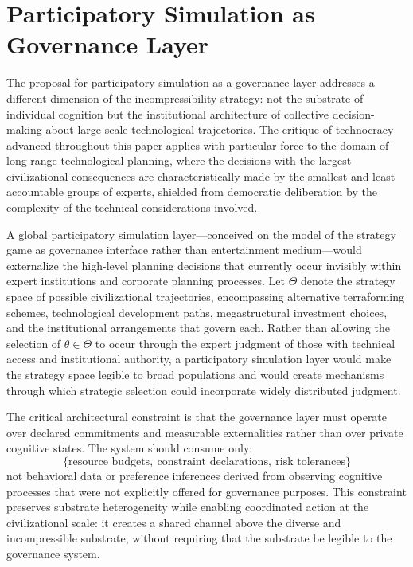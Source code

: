 \documentclass[12pt]{article}
\begin{document}
\section{Participatory Simulation as Governance Layer}

The proposal for participatory simulation as a governance layer addresses a different dimension of the incompressibility strategy: not the substrate of individual cognition but the institutional architecture of collective decision-making about large-scale technological trajectories. The critique of technocracy advanced throughout this paper applies with particular force to the domain of long-range technological planning, where the decisions with the largest civilizational consequences are characteristically made by the smallest and least accountable groups of experts, shielded from democratic deliberation by the complexity of the technical considerations involved.

A global participatory simulation layer---conceived on the model of the strategy game as governance interface rather than entertainment medium---would externalize the high-level planning decisions that currently occur invisibly within expert institutions and corporate planning processes. Let $\Theta$ denote the strategy space of possible civilizational trajectories, encompassing alternative terraforming schemes, technological development paths, megastructural investment choices, and the institutional arrangements that govern each. Rather than allowing the selection of $\theta \in \Theta$ to occur through the expert judgment of those with technical access and institutional authority, a participatory simulation layer would make the strategy space legible to broad populations and would create mechanisms through which strategic selection could incorporate widely distributed judgment.

The critical architectural constraint is that the governance layer must operate over declared commitments and measurable externalities rather than over private cognitive states. The system should consume only:
\[
\{ \text{resource budgets},\ \text{constraint declarations},\ \text{risk tolerances} \}
\]
not behavioral data or preference inferences derived from observing cognitive processes that were not explicitly offered for governance purposes. This constraint preserves substrate heterogeneity while enabling coordinated action at the civilizational scale: it creates a shared channel above the diverse and incompressible substrate, without requiring that the substrate be legible to the governance system.
\end{document}
